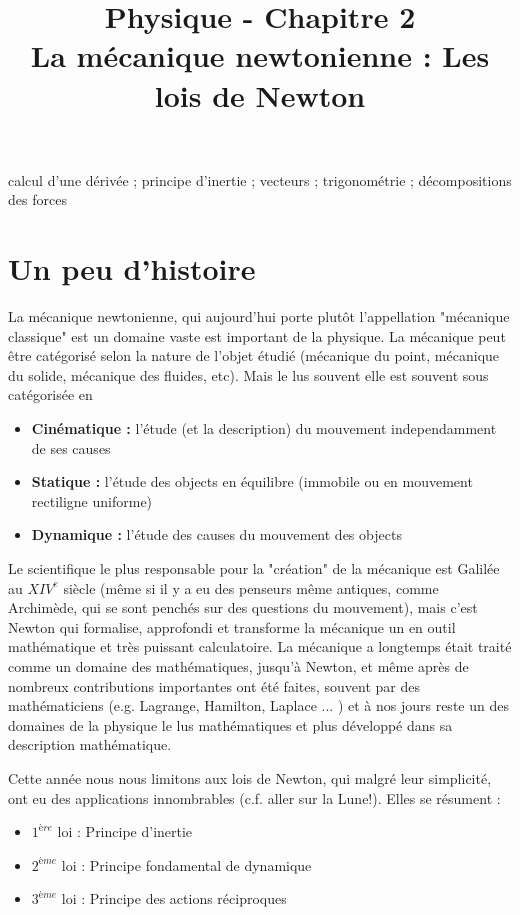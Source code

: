 \documentclass[11pt,a4paper]{article}
\title{\large Physique - Chapitre 2 \\ \LARGE  La mécanique newtonienne : Les lois de Newton \\}
\date{}
\author{}
\begin{document}
\maketitle

\vspace{-1cm}

\begin{tcolorbox}[title=Notions de la classe de première à rappeler]
calcul d'une dérivée ; principe d'inertie ; vecteurs ; trigonométrie ; décompositions des forces
\end{tcolorbox}
\tableofcontents

\section{Un peu d'histoire}

La mécanique newtonienne, qui aujourd'hui porte plutôt l'appellation "mécanique classique"  est un domaine vaste est important de la physique. La mécanique peut être catégorisé selon la nature de l'objet étudié (mécanique du point, mécanique du solide, mécanique des fluides, etc). Mais le lus souvent elle est souvent sous catégorisée en
\begin{itemize}
    \item \textbf{Cinématique  : }l'étude (et la description) du mouvement independamment de ses causes
    \item \textbf{Statique  : }l'étude des objects en équilibre (immobile ou en mouvement rectiligne uniforme)
    \item \textbf{Dynamique  : }l'étude des causes du mouvement des objects
\end{itemize}

Le scientifique le plus responsable pour la "création" de la mécanique est Galilée au $XIV^e$ siècle (même si il y a eu des penseurs même antiques, comme Archimède, qui se sont penchés sur des questions du mouvement), mais c'est Newton qui formalise, approfondi et transforme la mécanique un en outil mathématique et très puissant calculatoire. La mécanique a longtemps était traité comme un domaine des mathématiques, jusqu'à Newton, et même après de nombreux contributions importantes ont été faites, souvent par des mathématiciens (e.g. Lagrange, Hamilton, Laplace ... ) et à nos jours reste un des domaines de la physique le lus mathématiques et plus développé dans sa description mathématique. 

Cette année nous nous limitons aux lois de Newton, qui malgré leur simplicité, ont eu des applications innombrables (c.f. aller sur la Lune!). Elles se résument : 
\begin{itemize}
    \item $1^{ère}$ loi : Principe d'inertie
    \item $2^{ème}$ loi : Principe fondamental de dynamique
    \item $3^{ème}$ loi : Principe des actions réciproques
\end{itemize}
\end{document}
